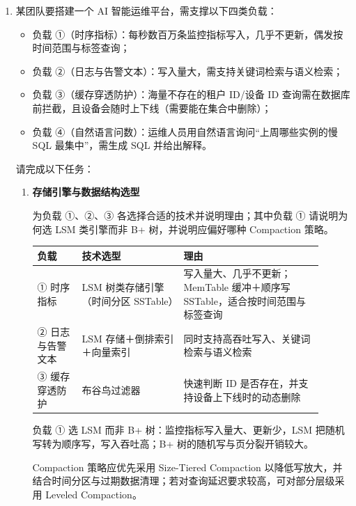 \documentclass[UTF8,a4paper,11pt]{ctexart}
\newenvironment{answer}%
  {\begin{ans}\noindent{\bfseries\color{ansframe}【答案】}\hspace{0.4em}}%
  {\end{ans}}
\begin{document}
\begin{enumerate}
\item 某团队要搭建一个 AI 智能运维平台，需支撑以下四类负载：

\begin{itemize}
\item 负载 ①（时序指标）：每秒数百万条监控指标写入，几乎不更新，偶发按时间范围与标签查询；
\item 负载 ②（日志与告警文本）：写入量大，需支持关键词检索与语义检索；
\item 负载 ③（缓存穿透防护）：海量不存在的租户 ID/设备 ID 查询需在数据库前拦截，且设备会随时上下线（需要能在集合中删除）；
\item 负载 ④（自然语言问数）：运维人员用自然语言询问“上周哪些实例的慢 SQL 最集中”，需生成 SQL 并给出解释。
\end{itemize}

请完成以下任务：

\begin{enumerate}
\item \textbf{存储引擎与数据结构选型}\par
为负载 ①、②、③ 各选择合适的技术并说明理由；其中负载 ① 请说明为何选 LSM 类引擎而非 B+ 树，并说明应偏好哪种 Compaction 策略。
\begin{answer}
\begin{center}
\begin{tabular}{@{}p{0.14\linewidth}p{0.32\linewidth}p{0.44\linewidth}@{}}
\toprule
负载 & 技术选型 & 理由 \\
\midrule
① 时序指标 & LSM 树类存储引擎（时间分区 SSTable） & 写入量大、几乎不更新；MemTable 缓冲＋顺序写 SSTable，适合按时间范围与标签查询 \\
② 日志与告警文本 & LSM 存储＋倒排索引＋向量索引 & 同时支持高吞吐写入、关键词检索与语义检索 \\
③ 缓存穿透防护 & 布谷鸟过滤器 & 快速判断 ID 是否存在，并支持设备上下线时的动态删除 \\
\bottomrule
\end{tabular}
\end{center}
负载 ① 选 LSM 而非 B+ 树：监控指标写入量大、更新少，LSM 把随机写转为顺序写，写入吞吐高；B+ 树的随机写与页分裂开销较大。\par
Compaction 策略应优先采用 Size-Tiered Compaction 以降低写放大，并结合时间分区与过期数据清理；若对查询延迟要求较高，可对部分层级采用 Leveled Compaction。
\end{answer}


\end{enumerate}
\end{enumerate}
\end{document}
